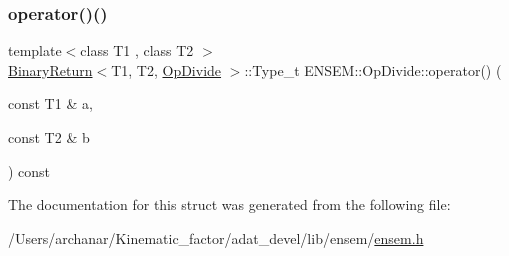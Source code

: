 \mbox{\label{structENSEM_1_1OpDivide_a20d785467177a704a754587d984736c3}} 
\subsubsection{\texorpdfstring{operator()()}{operator()()}\hspace{0.1cm}{\footnotesize\ttfamily [2/2]}}
{\footnotesize\ttfamily template$<$class T1 , class T2 $>$ \\
\mbox{\hyperlink{structENSEM_1_1BinaryReturn}{Binary\+Return}}$<$T1, T2, \mbox{\hyperlink{structENSEM_1_1OpDivide}{Op\+Divide}} $>$\+::Type\+\_\+t E\+N\+S\+E\+M\+::\+Op\+Divide\+::operator() (\begin{DoxyParamCaption}\item[{const T1 \&}]{a,  }\item[{const T2 \&}]{b }\end{DoxyParamCaption}) const\hspace{0.3cm}{\ttfamily [inline]}}



The documentation for this struct was generated from the following file\+:\begin{DoxyCompactItemize}
\item 
/\+Users/archanar/\+Kinematic\+\_\+factor/adat\+\_\+devel/lib/ensem/\mbox{\hyperlink{lib_2ensem_2ensem_8h}{ensem.\+h}}\end{DoxyCompactItemize}

